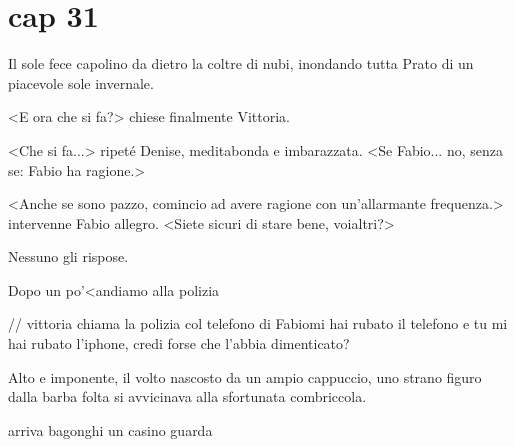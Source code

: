 \chapter{cap 31}

Il sole fece capolino da dietro la coltre di nubi, inondando tutta Prato di un piacevole sole invernale.

<E ora che si fa?> chiese finalmente Vittoria.

<Che si fa...> ripeté Denise, meditabonda e imbarazzata. <Se Fabio... no, senza se: Fabio ha ragione.>

<Anche se sono pazzo, comincio ad avere ragione con un'allarmante frequenza.> intervenne Fabio allegro. <Siete sicuri di stare bene, voialtri?>

Nessuno gli rispose.

Dopo un po'<andiamo alla polizia

// vittoria chiama la polizia col telefono di Fabiomi hai rubato il telefono
e tu mi hai rubato l'iphone, credi forse che l'abbia dimenticato?

Alto e imponente, il volto nascosto da un ampio cappuccio, uno strano
figuro dalla barba folta si avvicinava alla sfortunata combriccola.


arriva bagonghi un casino guarda
